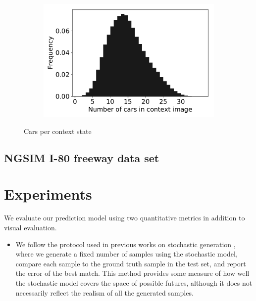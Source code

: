 \documentclass{article}
\begin{document}
\begin{figure}
  \centering
  \begin{subfigure}[b]{0.5\textwidth}
    \includegraphics[width=\textwidth]{images/car_statistics.pdf}
  \end{subfigure}
  \caption{Cars per context state}
  \label{car-statistics}
\end{figure}



\subsection{NGSIM I-80 freeway data set}



\section{Experiments}

We evaluate our prediction model using two quantitative metrics in addition to visual evaluation.
\begin{itemize}
\item We follow the protocol used in previous works on stochastic generation \citep{Walker2016, Babaeizadeh2018, Denton2018}, where we generate a fixed number of samples using the stochastic model, compare each sample to the ground truth sample in the test set, and report the error of the best match.
  This method provides some measure of how well the stochastic model covers the space of possible futures, although it does not necessarily reflect the realism of all the generated samples.
\end{itemize}
\end{document}
